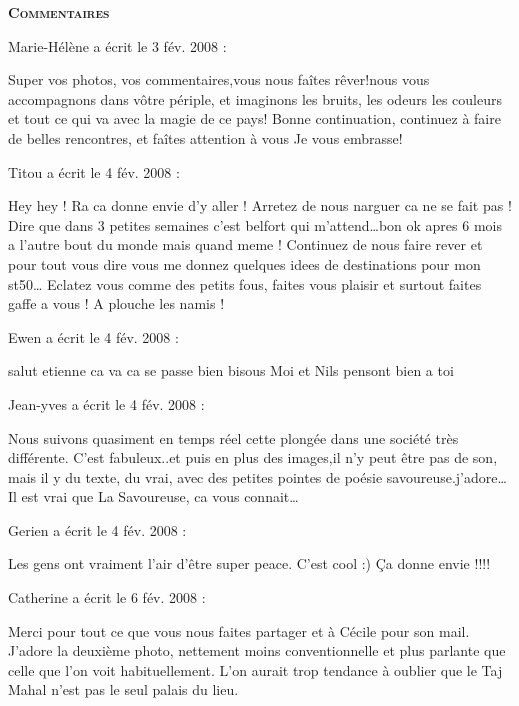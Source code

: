 \bigskip
\textbf{\textsc{Commentaires}}

\medskip
Marie-Hélène a écrit le 3 fév. 2008 :
\begin{displayquote}
Super vos photos, vos commentaires,vous nous faîtes rêver!nous vous accompagnons dans vôtre périple, et imaginons les bruits, les odeurs les couleurs et tout ce qui va avec la magie de ce pays!
Bonne continuation, continuez à faire de belles rencontres, et faîtes attention à vous
Je vous embrasse!
\end{displayquote}

\medskip
Titou a écrit le 4 fév. 2008 :
\begin{displayquote}
Hey hey ! Ra ca donne envie d'y aller ! Arretez de nous narguer ca ne se fait pas ! Dire que dans 3 petites semaines c'est belfort qui m'attend\dots bon ok apres 6 mois a l'autre bout du monde mais quand meme ! Continuez de nous faire rever et pour tout vous dire vous me donnez quelques idees de destinations pour mon st50\dots
Eclatez vous comme des petits fous, faites vous plaisir et surtout faites gaffe a vous ! A plouche les namis !
\end{displayquote}

\medskip
Ewen a écrit le 4 fév. 2008 :
\begin{displayquote}
salut etienne ca va ca se passe	bien
bisous  Moi et Nils pensont bien a toi
\end{displayquote}

\medskip
Jean-yves a écrit le 4 fév. 2008 :
\begin{displayquote}
Nous suivons quasiment en temps réel cette plongée dans une société très différente. C'est fabuleux..et puis en plus des images,il n'y peut être pas de son, mais il y du texte, du vrai, avec des petites pointes de poésie  savoureuse.j'adore\dots
Il est vrai que La Savoureuse, ca vous connait\dots
\end{displayquote}

\medskip
Gerien a écrit le 4 fév. 2008 :
\begin{displayquote}
Les gens ont vraiment l'air d'être super peace. C'est cool :)
Ça donne envie !!!!
\end{displayquote}

\medskip
Catherine a écrit le 6 fév. 2008 :
\begin{displayquote}
Merci pour tout ce que vous nous faites partager et à Cécile pour son mail.
        J'adore la deuxième photo, nettement moins conventionnelle et plus parlante que celle que l'on voit habituellement. L'on aurait trop tendance à oublier que le Taj Mahal n'est pas le seul palais du lieu.
\end{displayquote}

